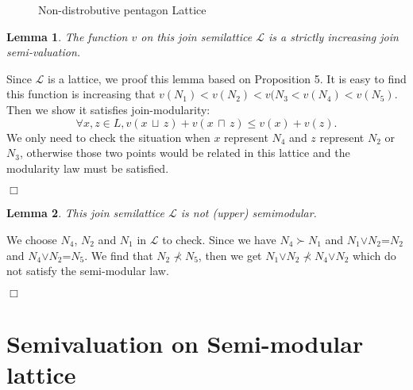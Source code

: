 \documentclass{article}
\newenvironment{proof}{\par \noindent {\bf Proof:}}{\begin{flushright}$\Box$\end{flushright}\par \noindent}
\newtheorem{lemma}{\bf Lemma}
\begin{document}
\begin{figure}
\centering
{}
\caption{Non-distrobutive pentagon Lattice}
\label{fig:p1}
\end{figure}

\begin{lemma}
The function $v$ on this join semilattice $\mathcal{L}$ is a strictly increasing join semi-valuation.
\end{lemma}
\begin{proof} 
Since $\mathcal{L}$ is a lattice, we proof this lemma based on Proposition 5. It is easy to find this function is increasing that $v(N_{1})$$<$$v(N_{2})$$<$$v(N_{3}$$<$$v(N_{4})$$<$$v(N_{5})$. Then we show it satisfies join-modularity: $$\forall x,z\in L, v(x \, \sqcup \,  z) + v(x \, \sqcap \,  z) \leq v(x) + v(z).$$ We only need to check the situation when $x$ represent $N_{4}$ and $z$ represent $N_{2}$ or $N_{3}$, otherwise those two points would be related in this lattice and the modularity law must be satisfied.
\end{proof} 

\begin{lemma}
This join semilattice $\mathcal{L}$ is not (upper) semimodular.
\end{lemma}

\begin{proof} 
We choose $N_{4}$, $N_{2}$ and $N_{1}$ in $\mathcal{L}$ to check. Since we have $N_{4}$$\succ$$N_{1}$ and $N_{1}$$\vee$$N_{2}$=$N_{2}$ and $N_{4}$$\vee$$N_{2}$=$N_{5}$. We find that $N_{2}$$\nprec$$N_{5}$, then we get $N_{1}$$\vee$$N_{2}$$\nprec$$N_{4}$$\vee$$N_{2}$ which do not satisfy the semi-modular law.
\end{proof} 






\section{Semivaluation on Semi-modular lattice}
\end{document}
